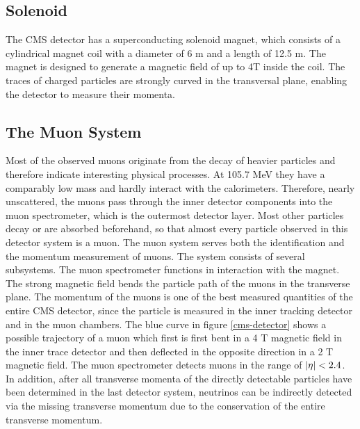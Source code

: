 \documentclass[12pt, a4paper]{thesis}
\begin{document}
\subsection{Solenoid}
\label{sec:org004c39a}
The CMS detector has a superconducting solenoid magnet, which consists
of a cylindrical magnet coil with a diameter of 6 m and a length of
12.5 m.  The magnet is designed to generate a magnetic field of up to
4T inside the coil. The traces of charged particles are strongly
curved in the transversal plane, enabling the detector to measure
their momenta.

\subsection{The Muon System}
\label{sec:org643030a}

Most of the observed muons originate from the decay of heavier
particles and therefore indicate interesting physical processes. At
105.7 MeV they have a comparably low mass and hardly interact with the
calorimeters.  Therefore, nearly unscattered, the muons pass through
the inner detector components into the muon spectrometer, which is the
outermost detector layer. Most other particles decay or are absorbed
beforehand, so that almost every particle observed in this detector
system is a muon. The muon system serves both the identification and
the momentum measurement of muons. The system consists of several
subsystems.  The muon spectrometer functions in interaction with the
magnet. The strong magnetic field bends the particle path of the muons
in the transverse plane. The momentum of the muons is one of the best
measured quantities of the entire CMS detector, since the particle is
measured in the inner tracking detector and in the muon chambers. The
blue curve in figure \ref{cms-detector} shows a possible trajectory of
a muon which first is first bent in a 4 T magnetic field in the inner
trace detector and then deflected in the opposite direction in a 2 T
magnetic field. The muon spectrometer detects muons in the range of
\(\abs{\eta} < 2.4\). In addition, after all transverse momenta of the
directly detectable particles have been determined in the last
detector system, neutrinos can be indirectly detected via the missing
transverse momentum due to the conservation of the entire transverse
momentum.
\end{document}
